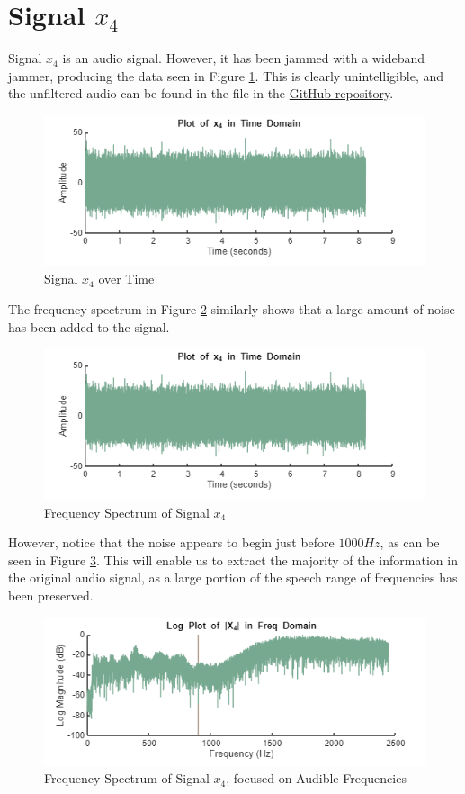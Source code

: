 
\section{Signal $x_4$}

Signal $x_4$ is an audio signal.  However, it has been jammed with a wideband jammer, producing the data seen in Figure \ref{fig:x4}.  This is clearly unintelligible, and the unfiltered audio can be found in the  file in the \href{https://github.com/dbcometto/ece434_cpx2}{GitHub repository}.

\begin{figure}[H]
    \centering
    \includegraphics[width=0.5\linewidth]{figures/x4.png}
    \caption{Signal $x_4$ over Time}
    \label{fig:x4}
\end{figure}

The frequency spectrum in Figure \ref{fig:X4} similarly shows that a large amount of noise has been added to the signal.  

\begin{figure}[H]
    \centering
    \includegraphics[width=0.5\linewidth]{figures/X4.png}
    \caption{Frequency Spectrum of Signal $x_4$}
    \label{fig:X4}
\end{figure}


However, notice that the noise appears to begin just before $1000 \unit{Hz}$, as can be seen in Figure \ref{fig:X4_1000}.  This will enable us to extract the majority of the information in the original audio signal, as a large portion of the speech range of frequencies has been preserved.


\begin{figure}[H]
    \centering
    \includegraphics[width=0.5\linewidth]{figures/X4_1000.png}
    \caption{Frequency Spectrum of Signal $x_4$, focused on Audible Frequencies}
    \label{fig:X4_1000}
\end{figure}

